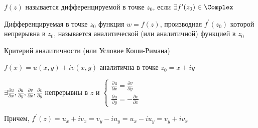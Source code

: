 \documentclass[12pt]{article}
\begin{document}
\hypertarget{derivative}{}

\Def $f(z)$ называется дифференцируемой в точке $z_0$, если $\exists f^\prime(z_0) \in \Complex$

\Defs Дифференцируемая в точке $z_0$ функция $w = f(z)$, производная $f^\prime(z_0)$ которой непрерывна в $z_0$,
называется аналитической (или аналитичной) функцией в $z_0$

\hypertarget{cauchy_riemann}{}

\begin{MyTheorem}
    \Ths Критерий аналитичности (или Условие Коши-Римана)

    \begin{center}
        $f(x) = u(x, y) + i v(x, y)$ аналитична в точке $z_0 = x + iy$ 
        
    
        $\exists \frac{\partial u}{\partial x}, \frac{\partial u}{\partial y}, \frac{\partial v}{\partial x}, \frac{\partial v}{\partial y}$ непрерывны в $z$ и
        $\begin{cases}\frac{\partial u}{\partial x} = \frac{\partial v}{\partial y} \\ \frac{\partial u}{\partial y} = -\frac{\partial v}{\partial x}\end{cases}$
    \end{center}

    Причем, $f^\prime(z) = u_x + i v_x = v_y - i u_y = u_x - i u_y = v_y + i v_x$
\end{MyTheorem}
\end{document}
